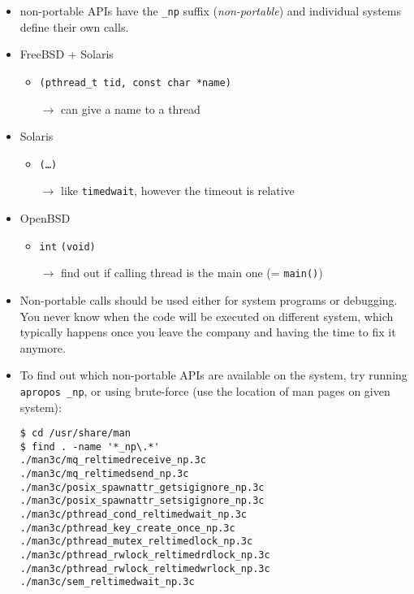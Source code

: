 

\begin{slide}

\begin{itemize}
\item non-portable APIs have the \texttt{\_np} suffix (\emph{non-portable}) and
individual systems define their own calls.

\item FreeBSD + Solaris
\begin{itemize}
\item {}\texttt{(pthread\_t tid, const char *name)}
\item[$\rightarrow$] can give a name to a thread
\end{itemize}

\item Solaris
\begin{itemize}
\item {}\texttt{(\dots)}
\item[$\rightarrow$] like \texttt{timedwait}, however the timeout is relative
\end{itemize}

\item OpenBSD
\begin{itemize}
\item \texttt{int} \texttt{(void)}
\item[$\rightarrow$] find out if calling thread is the main one
(= \texttt{main()})
\end{itemize}

\end{itemize}
\end{slide}

\begin{itemize}
\item Non-portable calls should be used either for system programs or
debugging. You never know when the code will be executed on different system,
which typically happens once you leave the company and having the time to
fix it anymore.
\item To find out which non-portable APIs are available on the system,
try running \texttt{apropos \_np}, or using brute-force (use the location
of man pages on given system):
\begin{verbatim}
$ cd /usr/share/man
$ find . -name '*_np\.*'
./man3c/mq_reltimedreceive_np.3c
./man3c/mq_reltimedsend_np.3c
./man3c/posix_spawnattr_getsigignore_np.3c
./man3c/posix_spawnattr_setsigignore_np.3c
./man3c/pthread_cond_reltimedwait_np.3c
./man3c/pthread_key_create_once_np.3c
./man3c/pthread_mutex_reltimedlock_np.3c
./man3c/pthread_rwlock_reltimedrdlock_np.3c
./man3c/pthread_rwlock_reltimedwrlock_np.3c
./man3c/sem_reltimedwait_np.3c
\end{verbatim}
\end{itemize}

\pagebreak

\endinput
